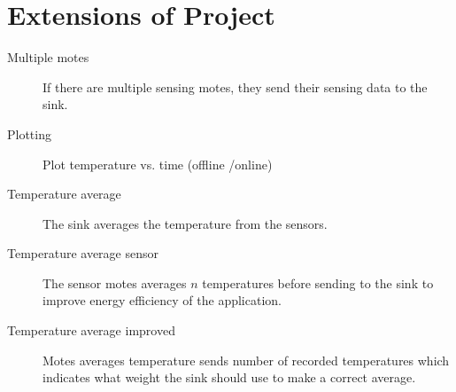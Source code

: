 \section{Extensions of Project}

\begin{description}
\item[Multiple motes] If there are multiple sensing motes, they send their sensing data to the sink.
\item[Plotting] Plot temperature vs. time (offline /online)
\item[Temperature average] The sink averages the temperature from the sensors.
\item[Temperature average sensor] The sensor motes averages $n$ temperatures before sending to the sink to improve energy efficiency of the application.
\item[Temperature average improved] Motes averages temperature sends number of recorded temperatures which indicates what weight the sink should use to make a correct average.

\end{description}
